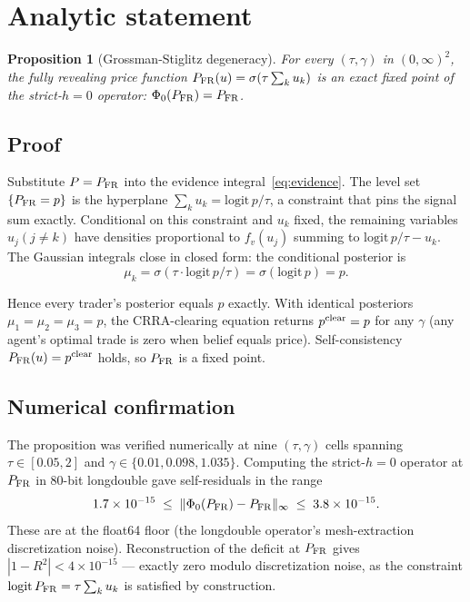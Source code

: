 \documentclass[11pt]{article}
\newtheorem{proposition}[theorem]{Proposition}
\newcommand{\1}{\mathbf{1}}
\newcommand{\PFR}{P_{\rm FR}}
\begin{document}
\section{Analytic statement}

\begin{proposition}[Grossman-Stiglitz degeneracy]\label{prop:GS-deg}
For every $(\tau, \gamma)$ in $(0,\infty)^2$, the fully revealing price
function $\PFR(u) = \sigma(\tau \sum_k u_k)$ is an exact fixed point of
the strict-$h=0$ operator: $\Phi_0(\PFR) = \PFR$.
\end{proposition}

\subsection{Proof}

Substitute $P = \PFR$ into the evidence integral~\eqref{eq:evidence}.
The level set $\{\PFR = p\}$ is the hyperplane $\sum_k u_k = \mathrm{logit}\,p
/\tau$, a constraint that pins the signal sum exactly.  Conditional on
this constraint and $u_k$ fixed, the remaining variables $u_j (j \ne
k)$ have densities proportional to $f_v(u_j)$ summing to
$\mathrm{logit}\,p/\tau - u_k$.  The Gaussian integrals close in closed form:
the conditional posterior is
\begin{equation}
\mu_k = \sigma(\tau \cdot \mathrm{logit}\,p / \tau) = \sigma(\mathrm{logit}\,p) = p.
\end{equation}

Hence every trader's posterior equals $p$ exactly.  With identical
posteriors $\mu_1 = \mu_2 = \mu_3 = p$, the CRRA-clearing equation
returns $p^{\rm clear} = p$ for any $\gamma$ (any agent's optimal trade
is zero when belief equals price).  Self-consistency $\PFR(u) = p^{\rm
clear}$ holds, so $\PFR$ is a fixed point.

\subsection{Numerical confirmation}

The proposition was verified numerically at nine $(\tau, \gamma)$ cells
spanning $\tau \in [0.05, 2]$ and $\gamma \in \{0.01, 0.098, 1.035\}$.
Computing the strict-$h=0$ operator at $\PFR$ in 80-bit longdouble
gave self-residuals in the range
\begin{equation}
1.7 \times 10^{-15} \;\le\; \|\Phi_0(\PFR) - \PFR\|_\infty \;\le\; 3.8 \times 10^{-15}.
\end{equation}
These are at the float64 floor (the longdouble operator's mesh-extraction
discretization noise).  Reconstruction of the deficit at $\PFR$ gives
$|1 - R^2| < 4 \times 10^{-15}$ --- exactly zero modulo
discretization noise, as the constraint $\mathrm{logit}\,\PFR = \tau
\sum_k u_k$ is satisfied by construction.
\end{document}
